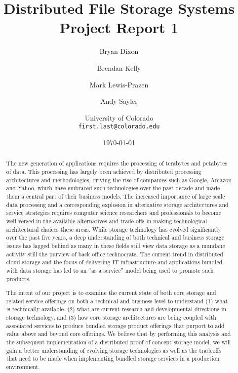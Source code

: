 \documentclass[11pt]{article}
\begin{document}
\title{
  Distributed File Storage Systems\\
  Project Report 1
}
\author{
  Bryan Dixon \and Brendan Kelly \and Mark Lewis-Prazen \and Andy Sayler\\
  \and University of Colorado\\
  \texttt{first.last@colorado.edu}
}
\date{\today}

\maketitle

\begin{abstract}
The new generation of applications requires the processing of terabytes and petabytes of data. This processing has 
largely been achieved by distributed processing architectures and methodologies, driving the rise of companies such as 
Google, Amazon and Yahoo, which have embraced such technologies over the past decade and made them a central part of 
their business models. The increased importance of large scale data processing and a corresponding explosion in 
alternative storage architectures and service strategies requires computer science researchers and professionals to 
become well versed in the available alternatives and trade-offs in making technological architectural choices these 
areas. While storage technology has evolved significantly over the past five years, a deep understanding of both 
technical and business storage issues has lagged behind as many in these fields still view data storage as a mundane 
activity still the purview of back office technocrats. The current trend in distributed cloud storage and the focus of 
delivering IT infrastructure and applications bundled with data storage has led to an “as a service” model being used 
to promote such products.

The intent of our project is to examine the current state of both core storage and related service offerings on both a 
technical and business level to understand (1) what is technically available, (2) what are current research and 
developmental directions in storage technology, and (3) how core storage architectures are being coupled with associated
services to produce bundled storage product offerings that purport to add value above and beyond core offerings. We 
believe that by performing this analysis and the subsequent implementation of a distributed proof of concept storage 
model, we will gain a better understanding of evolving storage technologies as well as the tradeoffs that need to be 
made when implementing bundled storage services in a production environment.

\end{abstract}
\end{document}
